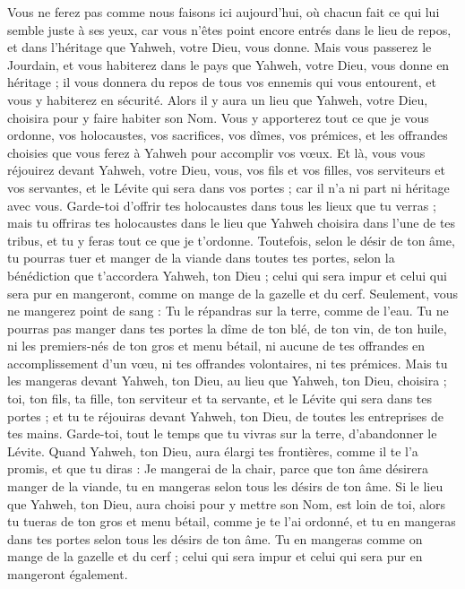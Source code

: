 \begin{multicols}{2}
Vous ne ferez pas comme nous faisons ici aujourd'hui, où chacun fait ce qui lui semble juste à ses yeux,
car vous n'êtes point encore entrés dans le lieu de repos, et dans l'héritage que Yahweh, votre Dieu, vous donne.
Mais vous passerez le Jourdain, et vous habiterez dans le pays que Yahweh, votre Dieu, vous donne en héritage ; il vous donnera du repos de tous vos ennemis qui vous entourent, et vous y habiterez en sécurité.
Alors il y aura un lieu que Yahweh, votre Dieu, choisira pour y faire habiter son Nom. Vous y apporterez tout ce que je vous ordonne, vos holocaustes, vos sacrifices, vos dîmes, vos prémices, et les offrandes choisies que vous ferez à Yahweh pour accomplir vos vœux.
Et là, vous vous réjouirez devant Yahweh, votre Dieu, vous, vos fils et vos filles, vos serviteurs et vos servantes, et le Lévite qui sera dans vos portes ; car il n'a ni part ni héritage avec vous.
Garde-toi d'offrir tes holocaustes dans tous les lieux que tu verras ;
mais tu offriras tes holocaustes dans le lieu que Yahweh choisira dans l'une de tes tribus, et tu y feras tout ce que je t'ordonne.
Toutefois, selon le désir de ton âme, tu pourras tuer et manger de la viande dans toutes tes portes, selon la bénédiction que t'accordera Yahweh, ton Dieu ; celui qui sera impur et celui qui sera pur en mangeront, comme on mange de la gazelle et du cerf.
Seulement, vous ne mangerez point de sang : Tu le répandras sur la terre, comme de l'eau.
Tu ne pourras pas manger dans tes portes la dîme de ton blé, de ton vin, de ton huile, ni les premiers-nés de ton gros et menu bétail, ni aucune de tes offrandes en accomplissement d'un vœu, ni tes offrandes volontaires, ni tes prémices.
Mais tu les mangeras devant Yahweh, ton Dieu, au lieu que Yahweh, ton Dieu, choisira ; toi, ton fils, ta fille, ton serviteur et ta servante, et le Lévite qui sera dans tes portes ; et tu te réjouiras devant Yahweh, ton Dieu, de toutes les entreprises de tes mains.
Garde-toi, tout le temps que tu vivras sur la terre, d'abandonner le Lévite.
Quand Yahweh, ton Dieu, aura élargi tes frontières, comme il te l'a promis, et que tu diras : Je mangerai de la chair, parce que ton âme désirera manger de la viande, tu en mangeras selon tous les désirs de ton âme.
Si le lieu que Yahweh, ton Dieu, aura choisi pour y mettre son Nom, est loin de toi, alors tu tueras de ton gros et menu bétail, comme je te l'ai ordonné, et tu en mangeras dans tes portes selon tous les désirs de ton âme.
Tu en mangeras comme on mange de la gazelle et du cerf ; celui qui sera impur et celui qui sera pur en mangeront également.

\end{multicols}
